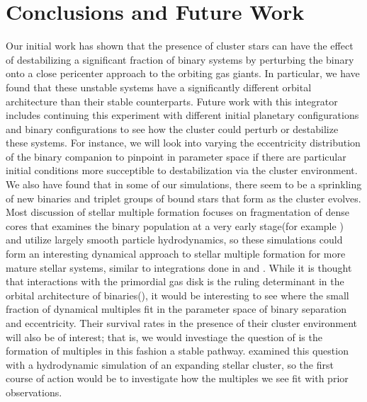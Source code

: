 \documentclass{aastex631}
\begin{document}
\section{Conclusions and Future Work}
Our initial work has shown that the presence
of cluster stars can have the effect of destabilizing a significant fraction of binary systems by perturbing the binary onto a close pericenter
approach to the orbiting gas giants.
In particular, we have found that these unstable systems have a significantly different orbital architecture than their stable counterparts. 
Future work with this integrator includes continuing this experiment with different initial planetary configurations and binary configurations to see how the cluster could
perturb or destabilize these systems. For instance, we will look into varying the eccentricity distribution of the binary companion to pinpoint in parameter space
if there are particular initial conditions more succeptible to destabilization via the cluster environment.
We also have found that in some of our simulations, there seem to be a sprinkling of new binaries and triplet groups of bound stars that form as the cluster evolves. 
Most discussion of stellar multiple formation focuses on fragmentation of dense cores that examines the binary population
at a very early stage(for example \cite{bon94}) and utilize largely smooth particle hydrodynamics, so these simulations could form an interesting dynamical approach to stellar multiple
formation for more mature stellar systems, similar to integrations done in \cite{kro01} and \cite{moe10}. While it is thought that interactions with the primordial gas disk is the ruling
determinant in the orbital architecture of binaries(\cite{kro01,krobur01,bat00}), it would be interesting to see where the small fraction of 
dynamical multiples fit in the parameter space of binary separation and eccentricity. Their survival rates in the presence of their cluster environment will also 
be of interest; that is, we would investiage the question of is the formation of multiples in this fashion a stable pathway.\cite{moe10} examined this question with a hydrodynamic
simulation of an expanding stellar cluster, so the first course of action would be to investigate how the multiples we see fit with prior observations.


\end{document}
